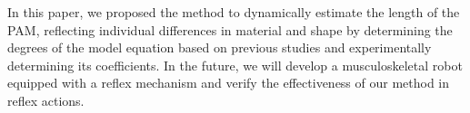 In this paper, we proposed the method to dynamically estimate the length of the PAM, reflecting individual differences in material and shape by determining the degrees of the model equation based on previous studies and experimentally determining its coefficients. In the future, we will develop a musculoskeletal robot equipped with a reflex mechanism and verify the effectiveness of our method in reflex actions.


